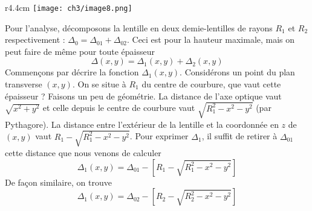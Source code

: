 	\begin{wrapfigure}[9]{r}{4.4cm}
	\vspace{-5mm}
	\texttt{[image: ch3/image8.png]}
	\end{wrapfigure}
	Pour l'analyse, décomposons la lentille en deux demie-lentilles de rayons $R_1$ et $R_2$ respectivement
	: $\Delta_0 = \Delta_{01}+\Delta_{02}$. Ceci est 
	pour la hauteur maximale, mais on peut faire de même pour toute épaisseur
	\begin{equation}
	\Delta (x,y) = \Delta_1(x,y) + \Delta_2(x,y)
	\end{equation}
	Commençons par décrire la fonction $\Delta_1(x,y)$. Considérons un point du plan transverse $(x,y)$. 
	On se situe à $R_1$ du centre de courbure, que vaut cette épaisseur ? Faisons un peu de géométrie. 
	La distance de l'axe optique vaut $\sqrt{x^2+y^2}$ et celle depuis le centre de courbure vaut 
	$\sqrt{R_1^2-x^2-y^2}$ (par Pythagore). La distance entre l'extérieur de la lentille et la 
	coordonnée en $z$ de $(x,y)$ vaut $R_1-\sqrt{R_1^2-x^2-y^2}$. Pour exprimer $\Delta_1$, il suffit 
	de retirer à $\Delta_{01}$ cette distance que nous venons de calculer
	\begin{equation}
	\Delta_1(x,y) = \Delta_{01}-\left[ R_1-\sqrt{R_1^2-x^2-y^2}\right]
	\end{equation}
	De façon similaire, on trouve
	\begin{equation}
	\Delta_1(x,y) = \Delta_{02}-\left[ R_2-\sqrt{R_2^2-x^2-y^2}\right]	
	\end{equation}

